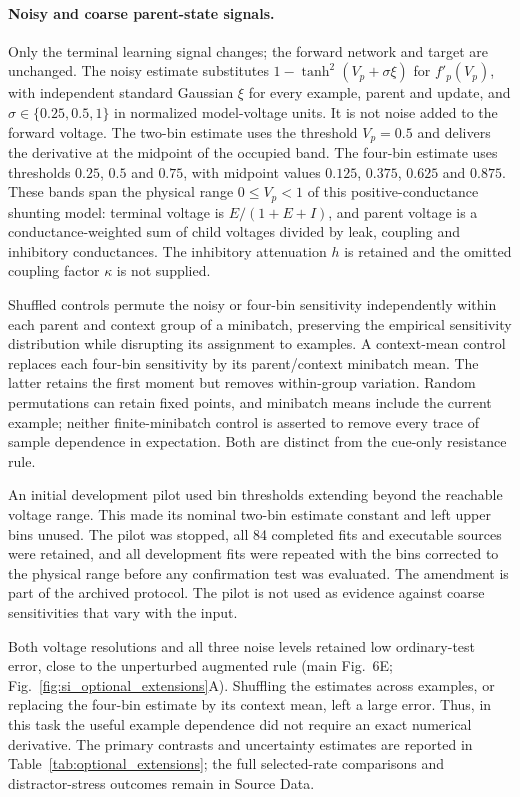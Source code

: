 \paragraph{Noisy and coarse parent-state signals.}
Only the terminal learning signal changes; the forward network and target are unchanged. The noisy estimate substitutes $1-\tanh^2(V_p+\sigma\xi)$ for $f'_p(V_p)$, with independent standard Gaussian $\xi$ for every example, parent and update, and $\sigma\in\{0.25,0.5,1\}$ in normalized model-voltage units. It is not noise added to the forward voltage. The two-bin estimate uses the threshold $V_p=0.5$ and delivers the derivative at the midpoint of the occupied band. The four-bin estimate uses thresholds $0.25$, $0.5$ and $0.75$, with midpoint values $0.125$, $0.375$, $0.625$ and $0.875$. These bands span the physical range $0\leq V_p<1$ of this positive-conductance shunting model: terminal voltage is $E/(1+E+I)$, and parent voltage is a conductance-weighted sum of child voltages divided by leak, coupling and inhibitory conductances. The inhibitory attenuation $h$ is retained and the omitted coupling factor $\kappa$ is not supplied.

Shuffled controls permute the noisy or four-bin sensitivity independently within each parent and context group of a minibatch, preserving the empirical sensitivity distribution while disrupting its assignment to examples. A context-mean control replaces each four-bin sensitivity by its parent/context minibatch mean. The latter retains the first moment but removes within-group variation. Random permutations can retain fixed points, and minibatch means include the current example; neither finite-minibatch control is asserted to remove every trace of sample dependence in expectation. Both are distinct from the cue-only resistance rule.

An initial development pilot used bin thresholds extending beyond the reachable voltage range. This made its nominal two-bin estimate constant and left upper bins unused. The pilot was stopped, all 84 completed fits and executable sources were retained, and all development fits were repeated with the bins corrected to the physical range before any confirmation test was evaluated. The amendment is part of the archived protocol. The pilot is not used as evidence against coarse sensitivities that vary with the input.

Both voltage resolutions and all three noise levels retained low ordinary-test error, close to the unperturbed augmented rule (main Fig.~6E; Fig.~\ref{fig:si_optional_extensions}A). Shuffling the estimates across examples, or replacing the four-bin estimate by its context mean, left a large error. Thus, in this task the useful example dependence did not require an exact numerical derivative. The primary contrasts and uncertainty estimates are reported in Table~\ref{tab:optional_extensions}; the full selected-rate comparisons and distractor-stress outcomes remain in Source Data.

